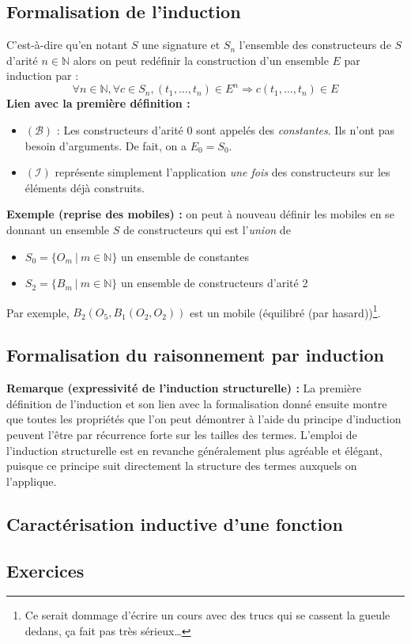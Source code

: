 \documentclass[../../main.tex]{subfiles}
\begin{document}
\subsection{Formalisation de l'induction}
C'est-à-dire qu'en notant $S$ une signature et $S_n$ l'ensemble des constructeurs de $S$ d'arité $n\in\mathbb{N}$
alors on peut redéfinir la construction d'un ensemble $E$ par induction par :
$$ \forall{n\in\mathbb{N}}, \forall c\in S_n, (t_1, \dots, t_n)\in E^n\Rightarrow c(t_1, \dots, t_n)\in E$$
\textbf{Lien avec la première définition :}
\begin{itemize}
	\item $(\mathcal{B})$ : Les constructeurs d'arité $0$ sont appelés des \textit{constantes}. Ils n'ont pas besoin d'arguments. De fait, on a $E_0 = S_0$.
	\item $(\mathcal{I})$ représente simplement l'application \textit{une fois} des constructeurs sur les éléments déjà construits.
\end{itemize}
\textbf{Exemple (reprise des mobiles) :} on peut à nouveau définir les mobiles en se donnant un ensemble $S$ de constructeurs qui est l'\textit{union} de
\begin{itemize}
	\item $S_0 = \{O_m\ |\ m\in\mathbb{N}\}$ un ensemble de constantes
	\item $S_2 = \{B_m\ |\ m\in\mathbb{N}\}$ un ensemble de constructeurs d'arité 2
\end{itemize}
Par exemple, $B_2(O_5, B_1(O_2, O_2))$ est un mobile (équilibré (par hasard))\footnote{Ce serait dommage d'écrire un cours avec des trucs qui se cassent la gueule dedans, ça fait pas très sérieux\dots}.
\subsection{Formalisation du raisonnement par induction}
\textbf{Remarque (expressivité de l'induction structurelle) :} La première définition de l'induction et son lien avec la formalisation donné ensuite montre que toutes les propriétés que l’on peut démontrer à l’aide du principe d’induction peuvent l'être par récurrence forte sur les tailles des termes. L’emploi de l’induction structurelle est en revanche généralement plus agréable
et élégant, puisque ce principe suit directement la structure des termes auxquels on l’applique. 
\subsection{Caractérisation inductive d'une fonction}
\subsection{Exercices}
\end{document}
